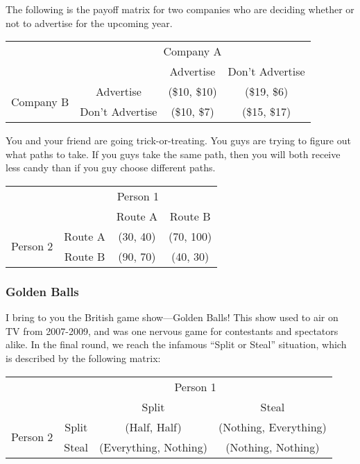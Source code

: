 \begin{gm}
The following is the payoff matrix for two companies who are deciding whether or not to advertise for the upcoming year.
\begin{center}
\renewcommand{\arraystretch}{1.5} %
\begin{tabular}{cc|c|c}
     &\multicolumn{3}{c}{Company A} \\
     && Advertise & Don't Advertise \\
     \cline{2-4}
     \multirow{2}{*}{Company B}& Advertise & (\$10, \$10) & (\$19, \$6) \\
     &Don't Advertise&(\$10, \$7) & (\$15, \$17) 
\end{tabular}
\end{center}
\end{gm}

\begin{gm}
You and your friend are going trick-or-treating. You guys are trying to figure out what paths to take. If you guys take the same path, then you will both receive less candy than if you guy choose different paths.
\begin{center}
\renewcommand{\arraystretch}{1.5} %
\begin{tabular}{cc|c|c}
     &\multicolumn{3}{c}{Person 1} \\
     && Route A & Route B \\
     \cline{2-4}
     \multirow{2}{*}{Person 2}& Route A & (30, 40) & (70, 100) \\
     &Route B&(90, 70) & (40, 30) 
\end{tabular}
\end{center}
\end{gm}

\subsubsection{Golden Balls}
\begin{gm}
I bring to you the British game show---Golden Balls! This show used to air on TV from 2007-2009, and was one nervous game for contestants and spectators alike. In the final round, we reach the infamous ``Split or Steal'' situation, which is described by the following matrix:
\begin{center}
\renewcommand{\arraystretch}{1.5} %
\begin{tabular}{cc|c|c}
     &\multicolumn{3}{c}{Person 1} \\
     && Split & Steal \\
     \cline{2-4}
     \multirow{2}{*}{Person 2}& Split & (Half, Half) & (Nothing, Everything) \\
     &Steal &(Everything, Nothing) & (Nothing, Nothing) 
\end{tabular}
\end{center}
\end{gm}

